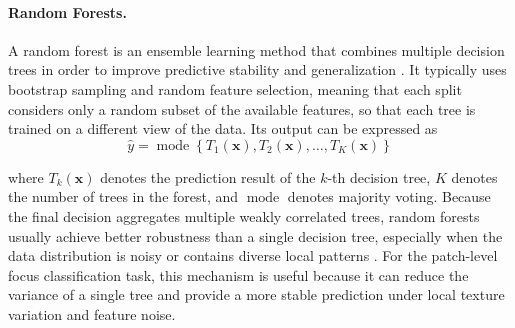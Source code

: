 \paragraph{Random Forests.} A random forest is an ensemble learning method that
combines multiple decision trees in order to improve predictive stability and
generalization \cite{breiman2001random}. It typically uses bootstrap sampling
and random feature selection, meaning that each split considers only a random
subset of the available features, so that each tree is trained on a different
view of the data. Its output can be expressed as
\begin{equation}
    \hat{y}=\operatorname{mode}\left\{T_1(\mathbf{x}),T_2(\mathbf{x}),\ldots,T_K(\mathbf{x})\right\}
    \label{eq:random-forest-basic}
\end{equation}
\par where $T_k(\mathbf{x})$ denotes the prediction result of the $k$-th
decision tree, $K$ denotes the number of trees in the forest, and
$\operatorname{mode}$ denotes majority voting. Because the final decision
aggregates multiple weakly correlated trees, random forests usually achieve
better robustness than a single decision tree, especially when the data
distribution is noisy or contains diverse local patterns
\cite{breiman2001random}. For the patch-level focus classification task, this
mechanism is useful because it can reduce the variance of a single tree and
provide a more stable prediction under local texture variation and feature
noise.

